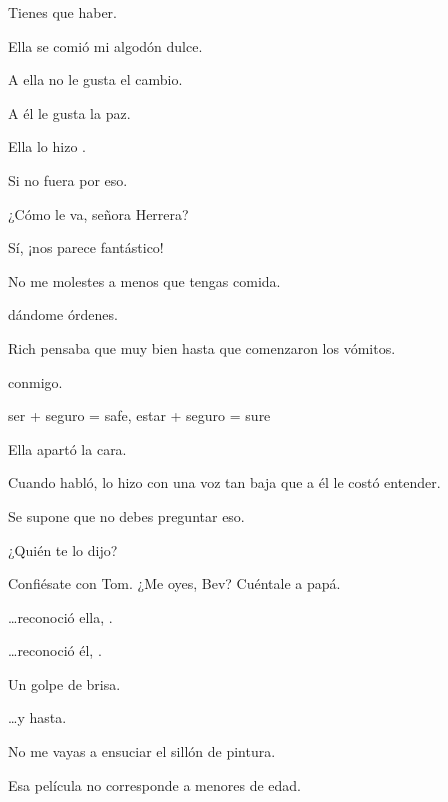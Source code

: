 \sk
Tienes que haber. 

\sk
Ella se comió mi algodón dulce. 

\sk
A ella no le gusta el cambio.

\sk
A él le gusta la paz.

\sk
Ella lo hizo . 

\sk
Si no fuera por eso. 

\sk
¿Cómo le va, señora Herrera?

\sk
Sí, ¡nos parece fantástico! 

\sk
No me molestes a menos que tengas comida. 

\sk
{} dándome órdenes. 

\sk
Rich pensaba que  muy bien hasta que comenzaron los vómitos. 

\sk
{} conmigo. 

\sk
ser + seguro = safe, estar + seguro = sure

\sk
Ella apartó la cara. 

\sk
Cuando habló, lo hizo con una voz tan baja que a él le costó entender. 

\sk
Se supone que no debes preguntar eso. 

\sk
¿Quién te lo dijo? 

\sk
Confiésate con Tom. ¿Me oyes, Bev? Cuéntale a papá.

\sk
\ldots{}reconoció ella, . 

\sk
\ldots{}reconoció él, . 

\sk
Un golpe de brisa. 

\sk
\ldots{}y hasta. 

\sk
No me vayas a ensuciar el sillón de pintura. 

\sk
Esa película no corresponde a menores de edad. 

